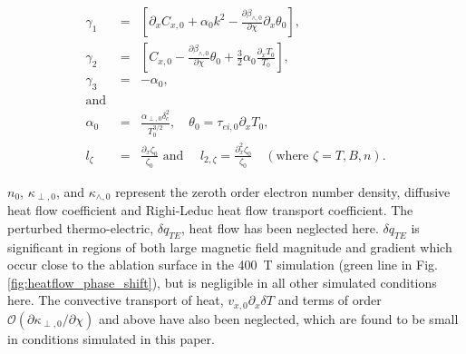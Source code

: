 \documentclass[aip,reprint]{revtex4-1}
\begin{document}
\begin{eqnarray}
\gamma_1 &=&\left[ \partial_x C_{x,0} + \alpha_0 k^2 - \frac{\partial \beta_{\wedge,0}}{\partial \chi}\partial_x \theta_0 \right],\nonumber\\
\gamma_2 &=&\left[ C_{x,0} -  \frac{\partial \beta_{\wedge,0}}{\partial \chi}  \theta_0 +\frac{3}{2}\alpha_0 \frac{\partial_x T_0}{T_0} \right ],\nonumber\\
\gamma_3 &=& -\alpha_0, \nonumber \\
\mbox{and } && \nonumber\\
\alpha_0 &=& \frac{\alpha_{\perp,0} \delta_c^2}{T_0^{3/2}}, \quad \theta_0 = \tau_{ei,0}\partial_x T_{0} , \nonumber\\
l_{\zeta} &=& \frac{\partial_x \zeta_0}{\zeta_0} \mbox{ and }\quad  l_{2,\zeta} = \frac{\partial_x^2 \zeta_0}{\zeta_0} \quad(\mbox{where } \zeta = T, B, n). \nonumber
\end{eqnarray}

$n_{0}$, $\kappa_{\perp,0}$, and $\kappa_{\wedge,0}$ represent the zeroth order electron number density, diffusive heat flow coefficient and Righi-Leduc heat flow transport coefficient. The perturbed thermo-electric, $\delta q_{TE}$, heat flow has been neglected here. $\delta q_{TE}$ is significant in regions of both large magnetic field magnitude and gradient which occur close to the ablation surface in the \SI{400}{T} simulation (green line in Fig. \ref{fig:heatflow_phase_shift}), but is negligible in all other simulated conditions here.  The convective transport of heat, $v_{x,0}\partial_x\delta T$ and terms of order $\mathcal{O}(\partial \kappa_{\perp,0}/\partial \chi)$ and above have also been neglected, which are found to be small in conditions simulated in this paper.
\end{document}
